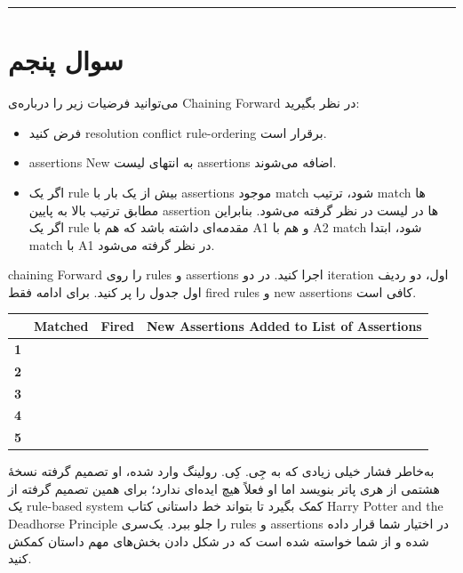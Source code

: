 \documentclass[a4paper,10pt]{article}
\begin{document}
\bigskip
\rule{\linewidth}{0.4pt}


\section{سوال پنجم}
می‌توانید فرضیات زیر را درباره‌ی
Chaining Forward
   در نظر بگیرید:

\begin{itemize}
	\item فرض کنید
	resolution conflict rule-ordering   
	برقرار است.
	\item assertions New 
	به انتهای لیست
	 assertions
	  اضافه می‌شوند.
	\item اگر یک 
	rule
	 بیش از یک بار با
	  assertions 
	 موجود
	  match 
	 شود، ترتیب 
	 match
	ها مطابق ترتیب بالا به پایین assertion ها در لیست در نظر گرفته می‌شود. بنابراین اگر یک 
	rule مقدمه‌ای داشته باشد که هم با A1 و هم با A2 match شود، ابتدا match با A1 در نظر گرفته می‌شود.
\end{itemize}

chaining Forward 
 را روی rules و assertions اجرا کنید. در دو iteration اول، دو ردیف اول جدول را پر کنید. برای ادامه فقط fired rules و new assertions کافی است.
 
 
 \begin{latin}
 	\begin{center}
 		\begin{tabular}{|c|c|c|c|}
 			\hline
 			& \textbf{Matched} & \textbf{Fired} & \textbf{New Assertions Added to List of Assertions} \\
 			\hline
 			\textbf{1} & & & \\
 			\hline
 			\textbf{2} & & & \\
 			\hline
 			\textbf{3} & & & \\
 			\hline
 			\textbf{4} & & & \\
 			\hline
 			\textbf{5} & & & \\
 			\hline
 		\end{tabular}
 	\end{center}
 \end{latin}

به‌خاطر فشار خیلی زیادی که به جِی. کِی. رولینگ وارد شده، او تصمیم گرفته نسخهٔ هشتمی از هری پاتر بنویسد اما او فعلاً هیچ ایده‌ای ندارد؛ برای همین تصمیم گرفته از یک rule-based system کمک بگیرد تا بتواند خط داستانی کتاب Harry Potter and the Deadhorse Principle را جلو ببرد.  یک‌سری rules و assertions در اختیار شما قرار داده شده و از شما خواسته شده است که در شکل دادن بخش‌های مهم داستان کمکش کنید.
\end{document}
